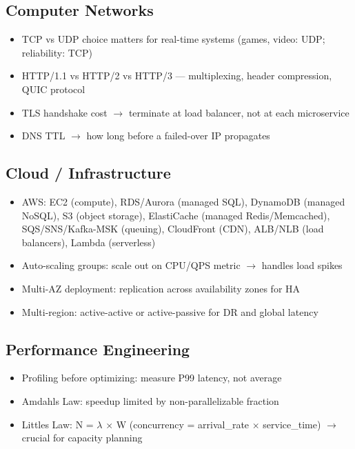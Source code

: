 \documentclass[11pt]{article}
\providecommand{\tightlist}{\setlength{\itemsep}{1pt}\setlength{\parskip}{0pt}}
\begin{document}
\subsection{Computer Networks}\label{computer-networks}

\begin{itemize}
\tightlist
\item
  TCP vs UDP choice matters for real-time systems (games, video: UDP; reliability: TCP)
\item
  HTTP/1.1 vs HTTP/2 vs HTTP/3 --- multiplexing, header compression, QUIC protocol
\item
  TLS handshake cost \(\rightarrow\) terminate at load balancer, not at each microservice
\item
  DNS TTL \(\rightarrow\) how long before a failed-over IP propagates
\end{itemize}

\subsection{Cloud / Infrastructure}\label{cloud--infrastructure}

\begin{itemize}
\tightlist
\item
  AWS: EC2 (compute), RDS/Aurora (managed SQL), DynamoDB (managed NoSQL), S3 (object storage), ElastiCache (managed Redis/Memcached), SQS/SNS/Kafka-MSK (queuing), CloudFront (CDN), ALB/NLB (load balancers), Lambda (serverless)
\item
  Auto-scaling groups: scale out on CPU/QPS metric \(\rightarrow\) handles load spikes
\item
  Multi-AZ deployment: replication across availability zones for HA
\item
  Multi-region: active-active or active-passive for DR and global latency
\end{itemize}

\subsection{Performance Engineering}\label{performance-engineering}

\begin{itemize}
\tightlist
\item
  Profiling before optimizing: measure P99 latency, not average
\item
  Amdahl\textquotesingle s Law: speedup limited by non-parallelizable fraction
\item
  Little\textquotesingle s Law: N = \(\lambda\) \(\times\) W (concurrency = arrival\_rate \(\times\) service\_time) \(\rightarrow\) crucial for capacity planning
\end{itemize}
\end{document}
